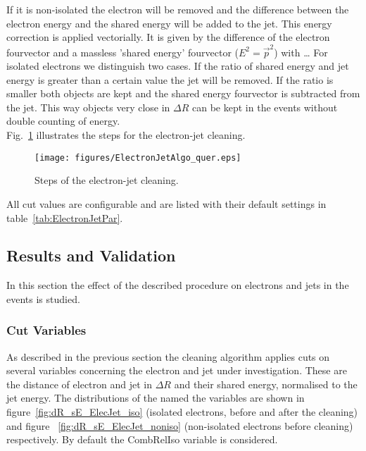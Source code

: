 \documentclass{cmspaper}
\begin{document}
If it is non-isolated the electron will be removed and the difference between
the electron energy and the shared energy will be added to the jet. This energy
correction is applied vectorially. It is given by the difference of the electron
fourvector and a massless 'shared energy' fourvector ($E^2=\vec{p}^2$)
{\color{red}with \ldots}
For isolated electrons we distinguish two cases. If the ratio of shared energy
and jet energy is greater than a certain value the jet will be removed. If the
ratio is smaller both objects are kept and the shared energy fourvector is subtracted from
the jet. This way objects very close in $\Delta R$ can be kept in the events
without double counting of energy.\\

Fig.~\ref{fig:EJCleaning} illustrates the steps for the electron-jet cleaning.\\
\begin{figure}[hbtp]
  \begin{center}
    \texttt{[image: figures/ElectronJetAlgo\_quer.eps]}
    \caption{Steps of the electron-jet cleaning.}
    \label{fig:EJCleaning}
  \end{center}
\end{figure}

All cut values are configurable and are listed with their default settings in
table~\ref{tab:ElectronJetPar}.

\subsection{Results and Validation}
In this section the effect of the described procedure on electrons and jets in
the events is studied. 

\subsubsection{Cut Variables}
As described in the previous section the cleaning algorithm applies cuts on
several variables concerning the electron and jet under investigation. These are
the distance of electron and jet in $\Delta R$ and their shared energy,
normalised to the jet energy. The distributions of the named the variables are shown
in figure~\ref{fig:dR_sE_ElecJet_iso} (isolated electrons, before and after the
cleaning) and figure ~\ref{fig:dR_sE_ElecJet_noniso} (non-isolated electrons
before cleaning) respectively. By default the CombRelIso variable is considered.
\end{document}
